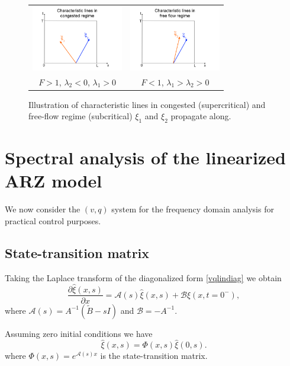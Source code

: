 \documentclass[a4paper, 10pt, conference]{ieeeconf}      %
\begin{document}
\begin{figure}
\begin{centering}
\begin{tabular}{cc}
\includegraphics[width=4cm]{Congested-regime} & \includegraphics[width=4cm]{Free-flow-regime}\tabularnewline
$F>1$, $\lambda_{2}<0$, $\lambda_{1}>0$ & $F<1$, $\lambda_{1}>\lambda_{2}>0$\tabularnewline
\end{tabular}
\par\end{centering}
\protect\caption{Illustration of characteristic lines in congested (supercritical) and free-flow regime (subcritical) $\xi_1$ and $\xi_2$ propagate along.\label{Characteristics}}
\end{figure}


\section{Spectral analysis of the linearized ARZ model}
We now consider the $(v,q)$ system for the frequency domain analysis for practical control purposes.

\subsection{State-transition matrix}
Taking the Laplace transform of the diagonalized form \eqref{vqlindiag} we obtain 
\begin{equation}
\dfrac{\partial \hat{\xi} (x,s)}{\partial x} = \mathscr{A}(s)\hat{\xi}(x,s) + \mathscr{B}\xi(x,t=0^-),
\end{equation}
where $\mathscr{A}(s) = A^{-1}(\tilde{B} - sI)$ and $\mathscr{B} = -A^{-1}$. 

Assuming zero initial conditions we have 
\begin{equation} \label{TFRiemann}
\hat{\xi}(x,s) = \Phi(x,s)\hat{\xi}(0,s).
\end{equation}
where $\Phi(x,s) = e^{\mathscr{A}(s)x}$ is the state-transition matrix.
\end{document}
